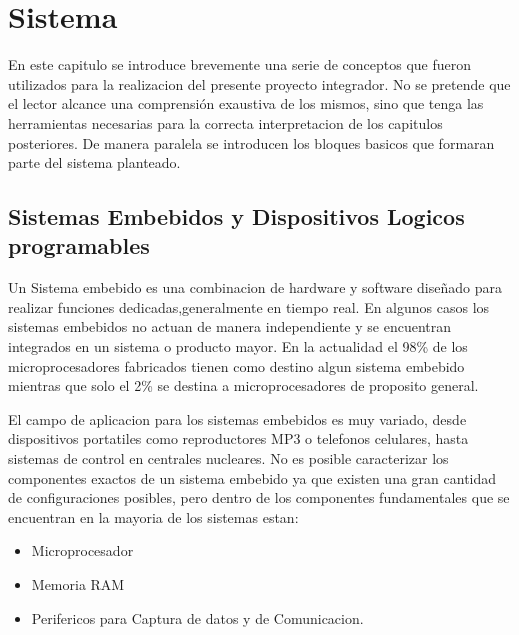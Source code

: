 \chapter{Sistema}
En este capitulo se introduce brevemente una serie de conceptos que fueron utilizados para la realizacion del presente proyecto integrador. No se pretende que el lector alcance una comprensión exaustiva de los mismos, sino que tenga las herramientas necesarias para la correcta interpretacion de los capitulos posteriores. De manera paralela se introducen los bloques basicos que formaran parte del sistema planteado.

\section{Sistemas Embebidos y Dispositivos Logicos programables}

Un Sistema embebido es una combinacion de hardware y software diseñado para realizar funciones dedicadas,generalmente en tiempo real. En algunos casos los sistemas embebidos no actuan de manera independiente y se encuentran integrados en un sistema o producto mayor.
En la actualidad el 98\% de los microprocesadores fabricados tienen como destino algun sistema embebido mientras que solo el 2\% se destina a microprocesadores de proposito general.

El campo de aplicacion para los sistemas embebidos es muy variado, desde dispositivos portatiles como reproductores MP3 o telefonos celulares, hasta sistemas de control en centrales nucleares.
No es posible caracterizar los componentes exactos de un sistema embebido ya que existen una gran cantidad de configuraciones posibles, pero dentro de los componentes fundamentales que se encuentran en la mayoria de los sistemas estan:

\begin{itemize}
\item Microprocesador
\item Memoria RAM 
\item Perifericos para Captura de datos y de Comunicacion.
\end{itemize}

